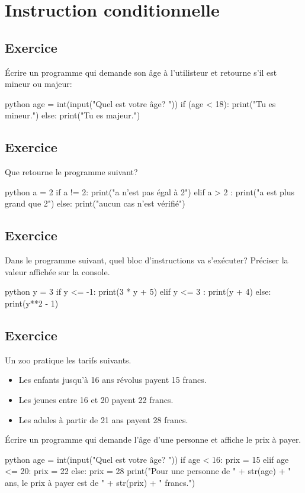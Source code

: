 \documentclass[a4paper,11pt]{article}
\begin{document}
\section{Instruction conditionnelle}

\subsection{Exercice}
Écrire un programme qui demande son âge à l'utilisteur et retourne s'il est mineur ou majeur:\\
\begin{solution}
\begin{code}[interactive]{python}
age = int(input("Quel est votre âge? "))
if (age < 18):
  print("Tu es mineur.")
else:
  print("Tu es majeur.")
\end{code}
\end{solution}

\subsection{Exercice}
Que retourne le programme suivant?
\begin{code}[interactive]{python}
a = 2
if a != 2:
    print("a n'est pas égal à 2")
elif a > 2 :
    print("a est plus grand que 2")
else:
    print("aucun cas n'est vérifié")
\end{code}

\subsection{Exercice}
Dans le programme suivant, quel bloc d'instructions va s'exécuter? Préciser la valeur affichée sur la console.
\begin{code}[interactive]{python}
y = 3
if y <= -1:
    print(3 * y + 5)
elif y <= 3 :
    print(y + 4)
else:
    print(y**2 - 1)
\end{code}

\subsection{Exercice}
Un zoo pratique les tarifs suivants.\\
\begin{itemize}
    \item Les enfants jusqu'à 16 ans révolus payent 15 francs.
    \item Les jeunes entre 16 et 20 payent 22 francs.
    \item Les adules à partir de 21 ans payent 28 francs.
\end{itemize}
Écrire un programme qui demande l'âge d'une personne et affiche le prix à payer.
\begin{solution}
\begin{code}[interactive]{python}
age = int(input("Quel est votre âge? "))
if age < 16:
    prix = 15
elif age <= 20:
    prix = 22
else:
    prix = 28
print("Pour une personne de " + str(age) + " ans, le prix à payer est de " + str(prix) + " francs.")
\end{code}
\end{solution}
\end{document}
